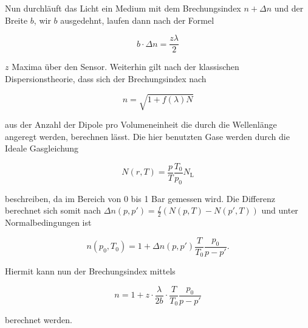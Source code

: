         \noindent Nun durchläuft das Licht ein Medium mit dem Brechungsindex $n+\Delta n $ und der Breite $b$, wir $b$ ausgedehnt, laufen 
        dann nach der Formel

        \begin{equation}
            b \cdot \Delta n = \frac{z \lambda}{2}
        \end{equation}

        \noindent $z$ Maxima über den Sensor. Weiterhin gilt nach der klassischen Dispersionstheorie, dass sich der Brechungsindex nach 
        
        \begin{equation}
            n = \sqrt{1 + f(\lambda) N}
        \end{equation}

        \noindent aus der Anzahl der Dipole pro Volumeneinheit die durch die Wellenlänge angeregt werden, berechnen lässt. Die hier benutzten 
        Gase werden durch die Ideale Gasgleichung 
        
        \begin{equation}
            N(r,T) = \frac{p}{T} \frac{T_0}{p_0} N_{\text{L}}
        \end{equation}

        \noindent beschreiben, da im Bereich von 0 bis 1 Bar gemessen wird. Die Differenz berechnet sich somit nach 
        $\Delta n(p,p') = \frac{f}{2}(N(p,T)-N(p',T))$ und unter Normalbedingungen ist 

        \begin{equation}
            n(p_0, T_0) = 1 + \Delta n(p,p') \frac{T}{T_0} \frac{p_0}{p-p'}.
        \end{equation}

        \noindent Hiermit kann nun der Brechungsindex mittels 

        \begin{equation}
            n = 1 + z \cdot \frac{\lambda}{2b} \cdot \frac{T}{T_0} \frac{p_0}{p - p'}
        \end{equation}

        \noindent berechnet werden.